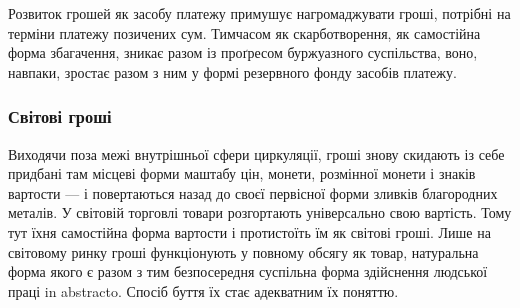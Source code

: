 Розвиток грошей як засобу платежу примушує нагромаджувати
гроші, потрібні на терміни платежу позичених сум. Тимчасом
як скарботворення, як самостійна форма збагачення, зникає
разом із проґресом буржуазного суспільства, воно, навпаки,
зростає разом з ним у формі резервного фонду засобів платежу.

\subsubsection{Світові гроші}

Виходячи поза межі внутрішньої сфери циркуляції, гроші
знову скидають із себе придбані там місцеві форми маштабу
цін, монети, розмінної монети і знаків вартости — і повертаються
назад до своєї первісної форми зливків благородних
металів. У світовій торговлі товари розгортають універсально
свою вартість. Тому тут їхня самостійна форма вартости і протистоїть
їм як світові гроші. Лише на світовому ринку гроші функціонують
у повному обсягу як товар, натуральна форма якого
є разом з тим безпосередня суспільна форма здійснення людської
праці in abstracto. Спосіб буття їх стає адекватним їх поняттю.

